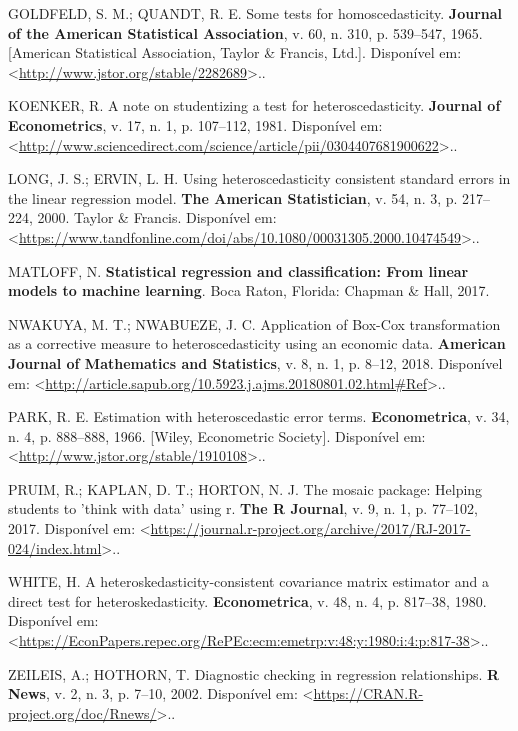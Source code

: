 \documentclass[a4paper, 12pt]{article}
\begin{document}
\leavevmode\hypertarget{ref-GQ}{}%
GOLDFELD, S. M.; QUANDT, R. E. Some tests for homoscedasticity.
\textbf{Journal of the American Statistical Association}, v. 60, n. 310,
p. 539--547, 1965. {[}American Statistical Association, Taylor \&
Francis, Ltd.{]}. Disponível em:
\textless{}\url{http://www.jstor.org/stable/2282689}\textgreater{}..

\leavevmode\hypertarget{ref-koenker1981}{}%
KOENKER, R. A note on studentizing a test for heteroscedasticity.
\textbf{Journal of Econometrics}, v. 17, n. 1, p. 107--112, 1981.
Disponível em:
\textless{}\url{http://www.sciencedirect.com/science/article/pii/0304407681900622}\textgreater{}..

\leavevmode\hypertarget{ref-Long}{}%
LONG, J. S.; ERVIN, L. H. Using heteroscedasticity consistent standard
errors in the linear regression model. \textbf{The American
Statistician}, v. 54, n. 3, p. 217--224, 2000. Taylor \& Francis.
Disponível em:
\textless{}\url{https://www.tandfonline.com/doi/abs/10.1080/00031305.2000.10474549}\textgreater{}..

\leavevmode\hypertarget{ref-matloff2017}{}%
MATLOFF, N. \textbf{Statistical regression and classification: From
linear models to machine learning}. Boca Raton, Florida: Chapman \&
Hall, 2017.

\leavevmode\hypertarget{ref-nigeria}{}%
NWAKUYA, M. T.; NWABUEZE, J. C. Application of Box-Cox transformation as
a corrective measure to heteroscedasticity using an economic data.
\textbf{American Journal of Mathematics and Statistics}, v. 8, n. 1, p.
8--12, 2018. Disponível em:
\textless{}\url{http://article.sapub.org/10.5923.j.ajms.20180801.02.html\#Ref}\textgreater{}..

\leavevmode\hypertarget{ref-Park}{}%
PARK, R. E. Estimation with heteroscedastic error terms.
\textbf{Econometrica}, v. 34, n. 4, p. 888--888, 1966. {[}Wiley,
Econometric Society{]}. Disponível em:
\textless{}\url{http://www.jstor.org/stable/1910108}\textgreater{}..

\leavevmode\hypertarget{ref-mosaic}{}%
PRUIM, R.; KAPLAN, D. T.; HORTON, N. J. The mosaic package: Helping
students to 'think with data' using r. \textbf{The R Journal}, v. 9, n.
1, p. 77--102, 2017. Disponível em:
\textless{}\url{https://journal.r-project.org/archive/2017/RJ-2017-024/index.html}\textgreater{}..

\leavevmode\hypertarget{ref-white1980}{}%
WHITE, H. A heteroskedasticity-consistent covariance matrix estimator
and a direct test for heteroskedasticity. \textbf{Econometrica}, v. 48,
n. 4, p. 817--38, 1980. Disponível em:
\textless{}\url{https://EconPapers.repec.org/RePEc:ecm:emetrp:v:48:y:1980:i:4:p:817-38}\textgreater{}..

\leavevmode\hypertarget{ref-lmtest}{}%
ZEILEIS, A.; HOTHORN, T. Diagnostic checking in regression
relationships. \textbf{R News}, v. 2, n. 3, p. 7--10, 2002. Disponível
em:
\textless{}\url{https://CRAN.R-project.org/doc/Rnews/}\textgreater{}..
\end{document}
